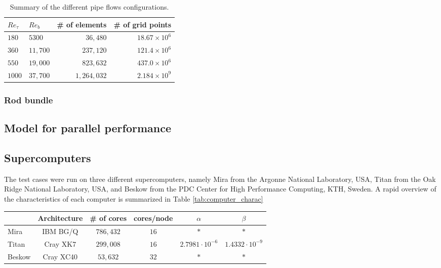 \documentclass{sig-alternate}
\begin{document}
\begin{table}
\centering
\caption{Summary of the different pipe flows configurations.}
\begin{tabular}{llrr} 
\hline
$Re_{\tau}$&$Re_{b}$&\# of elements & \# of grid points\\ 
\hline
$180$ & $5300$ & $36,480$ & $18.67 \times 10^6$\\
$360$ & $11,700$ & $237,120$ & $121.4 \times 10^6$\\ 
$550$ & $19,000$ & $823,632$ & $437.0 \times 10^6$\\ 
$1000$ & $37,700$ & $1,264,032$ & $2.184 \times 10^9$\\
\hline
\end{tabular}
\label{tab:pipe_conf}
\end{table}

\subsubsection{Rod bundle}

\subsection{Model for parallel performance}

\subsection{Supercomputers}

The test cases were run on three different supercomputers, namely Mira from the Argonne National Laboratory, USA, Titan from the Oak Ridge National Laboratory, USA, and Beskow from the PDC Center for High Performance Computing, KTH, Sweden. A rapid overview of the characteristics of each computer is summarized in Table \ref{tab:computer_charac}

\begin{table*}
\centering
\caption{Overview of the characteristics of the different supercomputers.}
\begin{tabular}{l|ccccc} 
\hline
 & Architecture & \# of cores & cores/node & $\alpha$ & $\beta$\\
 \hline
Mira & IBM BG/Q & $786,432$ & $16$ & $*$ & $*$\\ 
Titan & Cray XK7 & $299,008$ & $16$ & $2.7981 \cdot 10^{-6}$ & $1.4332 \cdot 10^{-9}$\\ 
Beskow & Cray XC40 & $53,632$ & $32$ & $*$ & $*$\\
\hline
\end{tabular}
\label{tab:computer_charac}
\end{table*}
\end{document}
